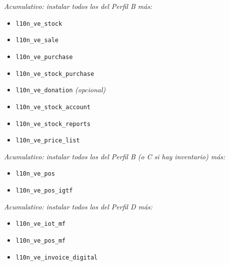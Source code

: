 \documentclass[11pt,a4paper]{article}
\newcommand{\modulo}[1]{\texttt{\textcolor{naranja}{#1}}}
\begin{document}
\begin{Form}
\vspace{6pt}

\begin{tcolorbox}[perfilbox, title={Perfil C — Módulos adicionales sobre Perfil B}]
\textit{Acumulativo: instalar todos los del Perfil B más:}
\begin{itemize}[leftmargin=1.2em, itemsep=3pt]
  \item[+] \modulo{l10n\_ve\_stock}
  \item[+] \modulo{l10n\_ve\_sale}
  \item[+] \modulo{l10n\_ve\_purchase}
  \item[+] \modulo{l10n\_ve\_stock\_purchase}
  \item[+] \modulo{l10n\_ve\_donation} \textit{(opcional)}
  \item[+] \modulo{l10n\_ve\_stock\_account}
  \item[+] \modulo{l10n\_ve\_stock\_reports}
  \item[+] \modulo{l10n\_ve\_price\_list}
\end{itemize}
\end{tcolorbox}

\vspace{6pt}

\begin{tcolorbox}[perfilbox, title={Perfil D — Módulos adicionales sobre Perfil B o C}]
\textit{Acumulativo: instalar todos los del Perfil B (o C si hay inventario) más:}
\begin{itemize}[leftmargin=1.2em, itemsep=3pt]
  \item[+] \modulo{l10n\_ve\_pos}
  \item[+] \modulo{l10n\_ve\_pos\_igtf}
\end{itemize}
\end{tcolorbox}

\vspace{6pt}

\begin{tcolorbox}[perfilbox, title={Perfil E — Módulos adicionales sobre Perfil D}]
\textit{Acumulativo: instalar todos los del Perfil D más:}
\begin{itemize}[leftmargin=1.2em, itemsep=3pt]
  \item[+] \modulo{l10n\_ve\_iot\_mf}
  \item[+] \modulo{l10n\_ve\_pos\_mf}
  \item[+] \modulo{l10n\_ve\_invoice\_digital}
\end{itemize}
\end{tcolorbox}


\end{Form}
\end{document}
